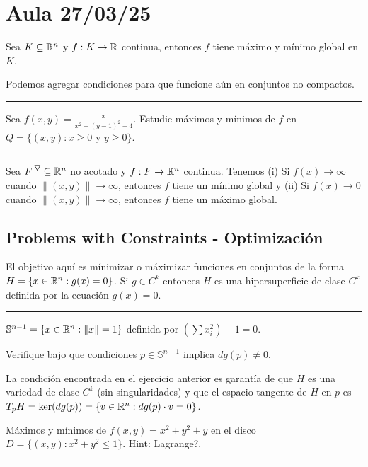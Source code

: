\section*{Aula 27/03/25}

\begin{theorem}
    Sea \(K\subseteq \mathbb{R}^n\) y \(f:K\to \mathbb{R}\) continua, entonces \(f\) tiene máximo y mínimo global en \(K\). 
\end{theorem}
\begin{note}
    Podemos agregar condiciones para que funcione aún en conjuntos no compactos. 
\end{note}

\E

\hrule
\begin{example}
    Sea \(f(x,y) = \frac{x}{x^2 + (y-1)^2 + 4 }\). Estudie máximos y mínimos de \(f\) en \(Q = \{(x,y) : x\geq 0 \text{ y } y\geq 0\}\). 
\end{example}
\hrule 

\E

\begin{proposition}
    Sea \(F^\ce\subseteq \R^n\) no acotado y \(f:F\to \mathbb{R}^n\) continua. Tenemos (i) Si \(f(x)\to \infty \) cuando \(\|(x,y)\|\to \infty \), entonces \(f\) tiene un mínimo global y (ii) Si \(f(x) \to 0\) cuando \(\|(x,y)\|\to \infty\), entonces \(f\) tiene un máximo global. 
\end{proposition}

\subsection*{Problems with Constraints - Optimización}

El objetivo aquí es mínimizar o máximizar funciones en conjuntos de la forma \(H = \{x\in \mathbb{R}^n: g(x)=0\}\). Si \(g\in C^k\) entonces \(H\) es una hipersuperficie de clase \(C^k\) definida por la ecuación \(g(x)=0\). 

\E

\hrule 
\begin{example}
    \(\mathbb{S}^{n-1} = \{x\in \mathbb{R}^n: \|x\| = 1\}\) definida por \(\left(\sum x_i^2\right) - 1 = 0 \). 
\end{example}
\begin{exercise}
    Verifique bajo que condiciones \(p\in \mathbb{S}^{n-1}\) implica \(dg(p)\neq 0\). 
\end{exercise}
\begin{note}
    La condición encontrada en el ejercicio anterior es garantía de que \(H\) es una variedad de clase \(C^k\) (sin singularidades) y que el espacio tangente de \(H\) en \(p\) es \(T_pH=\ker(dg(p))=\{v\in \mathbb{R}^n: dg(p)\cdot v = 0\}\).  
\end{note}
\begin{example}
    Máximos y mínimos de \(f(x,y) = x^2+y^2+y\) en el disco \(D=\{(x,y):x^2+y^2 \leq 1 \}\). Hint: Lagrange?. 
\end{example}
\hrule 

